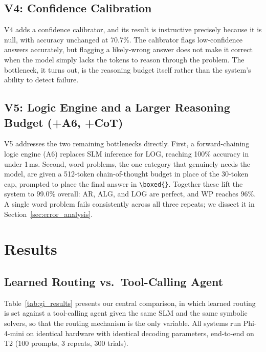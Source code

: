 \documentclass[journal]{IEEEtai}
\begin{document}
\subsection{V4: Confidence Calibration}

V4 adds a confidence calibrator, and its result is instructive precisely because it is null, with accuracy unchanged at 70.7\%. The calibrator flags low-confidence answers accurately, but flagging a likely-wrong answer does not make it correct when the model simply lacks the tokens to reason through the problem. The bottleneck, it turns out, is the reasoning budget itself rather than the system's ability to detect failure.

\subsection{V5: Logic Engine and a Larger Reasoning Budget (+A6, +CoT)}

V5 addresses the two remaining bottlenecks directly. First, a forward-chaining logic engine (A6) replaces SLM inference for LOG, reaching 100\% accuracy in under 1\,ms. Second, word problems, the one category that genuinely needs the model, are given a 512-token chain-of-thought budget in place of the 30-token cap, prompted to place the final answer in \texttt{\textbackslash boxed\{\}}. Together these lift the system to 99.0\% overall: AR, ALG, and LOG are perfect, and WP reaches 96\%. A single word problem fails consistently across all three repeats; we dissect it in Section~\ref{sec:error_analysis}.

\section{Results}
\label{sec:results}

\subsection{Learned Routing vs.\ Tool-Calling Agent}

Table~\ref{tab:gi_results} presents our central comparison, in which learned routing is set against a tool-calling agent given the same SLM and the same symbolic solvers, so that the routing mechanism is the only variable. All systems run Phi-4-mini on identical hardware with identical decoding parameters, end-to-end on T2 (100 prompts, 3 repeats, 300 trials).
\end{document}
